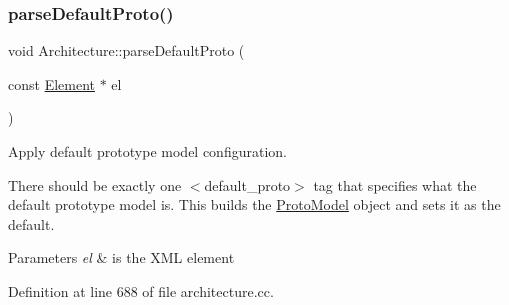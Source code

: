 \subsubsection{\texorpdfstring{parseDefaultProto()}{parseDefaultProto()}}
{\footnotesize\ttfamily void Architecture\+::parse\+Default\+Proto (\begin{DoxyParamCaption}\item[{const \mbox{\hyperlink{class_element}{Element}} $\ast$}]{el }\end{DoxyParamCaption})\hspace{0.3cm}{\ttfamily [protected]}}



Apply default prototype model configuration. 

There should be exactly one $<$default\+\_\+proto$>$ tag that specifies what the default prototype model is. This builds the \mbox{\hyperlink{class_proto_model}{Proto\+Model}} object and sets it as the default. 
\begin{DoxyParams}{Parameters}
{\em el} & is the X\+ML element \\
\hline
\end{DoxyParams}


Definition at line 688 of file architecture.\+cc.

